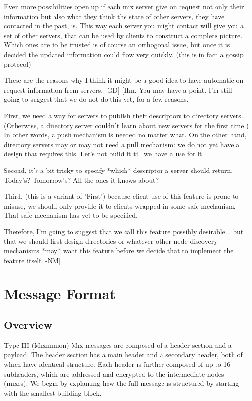  Even more possibilities open up if each mix server give on request not only 
 their information but also what they think the state of other servers, they 
 have contacted in the past, is. This way each server you might contact will 
 give you a set of other servers, that can be used by clients to construct a 
 complete picture. Which ones are to be trusted is of course an orthogonal 
 issue, but once it is decided the updated information could flow very 
 quickly. (this is in fact a gossip protocol)

 These are the reasons why I think it might be a good idea to have automatic 
 on request information from servers. -GD]
[Hm.  You may have a point.  I'm still going to suggest that we do
 not do this yet, for a few reasons.

 First, we need a way for servers to publish their descriptors to
 directory servers.  (Otherwise, a directory server couldn't learn
 about new servers for the first time.)  In other words, a push
 mechanism is needed no matter what.  On the other hand, directory
 servers may or may not need a pull mechanism: we do not yet have a
 design that requires this.  Let's not build it till we have a use
 for it.

 Second, it's a bit tricky to specify *which* descriptor a server
 should return.  Today's?  Tomorrow's?  All the ones it knows about?

 Third, (this is a variant of 'First') because client use of this
 feature is prone to misuse, we should only provide it to clients
 wrapped in some safe mechanism.  That safe mechanism has yet to be
 specified.

 Therefore, I'm going to suggest that we call this feature possibly
 desirable... but that we should first design directories or whatever
 other node discovery mechanisms *may* want this feature before we
 decide that to implement the feature itself. -NM]

\section{Message Format}

\subsection{Overview}

Type III (Mixminion) Mix messages are composed of a header section and a
payload.  The header section has a main header and a
secondary header, both of which have identical structure.  Each
header is further composed of up to 16 subheaders, which are
addressed and encrypted to the intermediate nodes (mixes).  We
begin by explaining how the full message is structured by starting
with the smallest building block.

